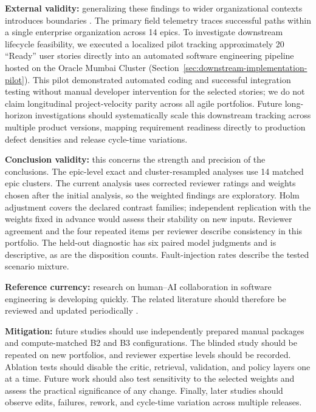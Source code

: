 \documentclass[manuscript,review]{acmart}
\begin{document}
\textbf{External validity:} generalizing these findings to wider organizational contexts introduces boundaries \cite{R71,R58}. The primary field telemetry traces successful paths within a single enterprise organization across 14 epics. To investigate downstream lifecycle feasibility, we executed a localized pilot tracking approximately 20 ``Ready'' user stories directly into an automated software engineering pipeline hosted on the Oracle Mumbai Cluster (Section~\ref{sec:downstream-implementation-pilot}). This pilot demonstrated automated coding and successful integration testing without manual developer intervention for the selected stories; we do not claim longitudinal project-velocity parity across all agile portfolios. Future long-horizon investigations should systematically scale this downstream tracking across multiple product versions, mapping requirement readiness directly to production defect densities and release cycle-time variations.

\textbf{Conclusion validity:} this concerns the strength and precision of the conclusions. The epic-level exact and cluster-resampled analyses use 14 matched epic clusters. The current analysis uses corrected reviewer ratings and weights chosen after the initial analysis, so the weighted findings are exploratory. Holm adjustment covers the declared contrast families; independent replication with the weights fixed in advance would assess their stability on new inputs. Reviewer agreement and the four repeated items per reviewer describe consistency in this portfolio. The held-out diagnostic has six paired model judgments and is descriptive, as are the disposition counts. Fault-injection rates describe the tested scenario mixture.

\textbf{Reference currency:} research on human--AI collaboration in software engineering is developing quickly. The related literature should therefore be reviewed and updated periodically \cite{R72}.

\textbf{Mitigation:} future studies should use independently prepared manual packages and compute-matched B2 and B3 configurations. The blinded study should be repeated on new portfolios, and reviewer expertise levels should be recorded. Ablation tests should disable the critic, retrieval, validation, and policy layers one at a time. Future work should also test sensitivity to the selected weights and assess the practical significance of any change. Finally, later studies should observe edits, failures, rework, and cycle-time variation across multiple releases.
\end{document}
